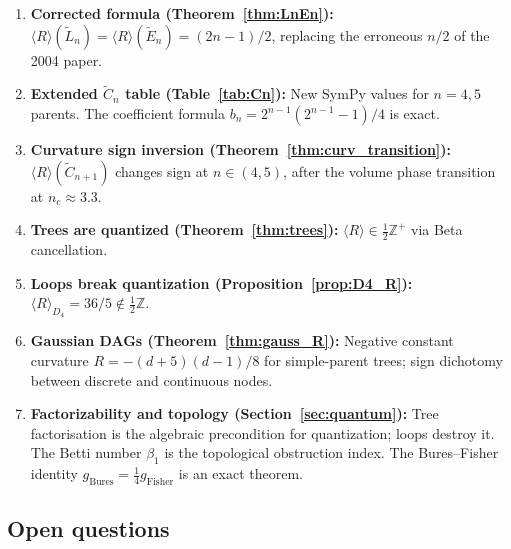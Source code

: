 \documentclass[11pt]{article}
\theoremstyle{definition}
\begin{document}
\begin{enumerate}
\item \textbf{Corrected formula (Theorem~\ref{thm:LnEn}):} 
  $\langle R\rangle(\tilde{L}_n) = \langle R\rangle(\tilde{E}_n) = (2n-1)/2$, 
  replacing the erroneous $n/2$ of the 2004 paper.

\item \textbf{Extended $\tilde{C}_n$ table (Table~\ref{tab:Cn}):} 
  New SymPy values for $n=4,5$ parents.  The coefficient formula 
  $b_n = 2^{n-1}(2^{n-1}-1)/4$ is exact.

\item \textbf{Curvature sign inversion (Theorem~\ref{thm:curv_transition}):} 
  $\langle R\rangle(\tilde{C}_{n+1})$ changes sign at $n \in (4,5)$, 
  after the volume phase transition at $n_c \approx 3.3$.

\item \textbf{Trees are quantized (Theorem~\ref{thm:trees}):} 
  $\langle R\rangle \in \tfrac{1}{2}\mathbb{Z}^+$ via Beta cancellation.

\item \textbf{Loops break quantization (Proposition~\ref{prop:D4_R}):} 
  $\langle R\rangle_{D_4} = 36/5 \notin \tfrac{1}{2}\mathbb{Z}$.

\item \textbf{Gaussian DAGs (Theorem~\ref{thm:gauss_R}):} 
  Negative constant curvature $R = -(d+5)(d-1)/8$ for simple-parent trees; 
  sign dichotomy between discrete and continuous nodes.

\item \textbf{Factorizability and topology (Section~\ref{sec:quantum}):} 
  Tree factorisation is the algebraic precondition for quantization; 
  loops destroy it.  The Betti number $\beta_1$ is the topological 
  obstruction index.  The Bures--Fisher identity 
  $g_{\mathrm{Bures}} = \tfrac{1}{4}g_{\mathrm{Fisher}}$ is an exact theorem.
\end{enumerate}

\subsection{Open questions}
\end{document}
